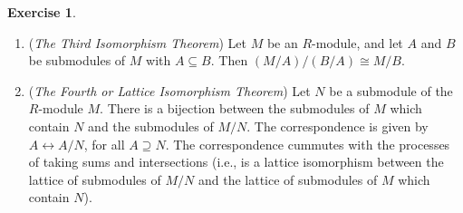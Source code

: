 \documentclass[8pt]{amsart}
\theoremstyle{plain}%
\theoremstyle{definition}
\newtheorem{exercise}{Exercise}[section]
\theoremstyle{remark}
\numberwithin{equation}{section}
\begin{document}
\begin{exercise}
\begin{enumerate}
\begin{proof}
			\end{proof}
		\item (\textit{The Third Isomorphism Theorem}) Let $M$ be an $R$-module, and let $A$ and $B$ be submodules of $M$ with $A \subseteq B$. Then $(M/A)/(B/A) \cong M/B$.
		\item (\textit{The Fourth or Lattice Isomorphism Theorem}) Let $N$ be a submodule of the $R$-module $M$. There is a bijection between the submodules of $M$ which contain $N$ and the submodules of $M/N$. The correspondence is given by $A \leftrightarrow A/N$, for all $A \supseteq N$. The correspondence cummutes with the processes of taking sums and intersections (i.e., is a lattice isomorphism between the lattice of submodules of $M/N$ and the lattice of submodules of $M$ which contain $N$).
	\end{enumerate}
\end{exercise}
\end{document}
